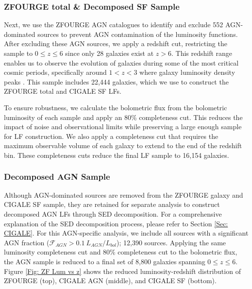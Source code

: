 \subsubsection{ZFOURGE total \& Decomposed SF Sample} \label{Sec: Galaxy LF Selection}
Next, we use the ZFOURGE AGN catalogues \citep{cowley_zfourge_2016} to identify and exclude 552 AGN-dominated sources to prevent AGN contamination of the luminosity functions. After excluding these AGN sources, we apply a redshift cut, restricting the sample to $0 \leq z \leq 6$ since only 28 galaxies exist at $z > 6$. This redshift range enables us to observe the evolution of galaxies during some of the most critical cosmic periods, specifically around $1 < z < 3$ \citep{gruppioni_modelling_2011, wylezalek_galaxy_2014} where galaxy luminosity density peaks \citep{assef_mid-ir-_2011}. This sample includes 22,444 galaxies, which we use to construct the ZFOURGE total and CIGALE SF LFs.

To ensure robustness, we calculate the bolometric flux from the bolometric luminosity of each sample and apply an 80\% completeness cut. This reduces the impact of noise and observational limits while preserving a large enough sample for LF construction. We also apply a completeness cut that requires the maximum observable volume of each galaxy to extend to the end of the redshift bin. These completeness cuts reduce the final LF sample to 16,154 galaxies.



\subsubsection{Decomposed AGN Sample} \label{Sec: Decomposed AGN Selection}
Although AGN-dominated sources are removed from the ZFOURGE galaxy and CIGALE SF sample, they are retained for separate analysis to construct decomposed AGN LFs through SED decomposition. For a comprehensive explanation of the SED decomposition process, please refer to Section \ref{Sec: CIGALE}. For this AGN-specific analysis, we include all sources with a significant AGN fraction ($\mathcal{F}_{AGN}>0.1\ L_{AGN}/L_{bol}$); 12,390 sources. Applying the same luminosity completeness cut and 80\% completeness cut to the bolometric flux, the AGN sample is reduced to a final set of 8,800 galaxies spanning $0 \leq z \leq 6$. Figure \ref{Fig: ZF Lum vs z} shows the reduced luminosity-redshift distribution of ZFOURGE (top), CIGALE AGN (middle), and CIGALE SF (bottom).


